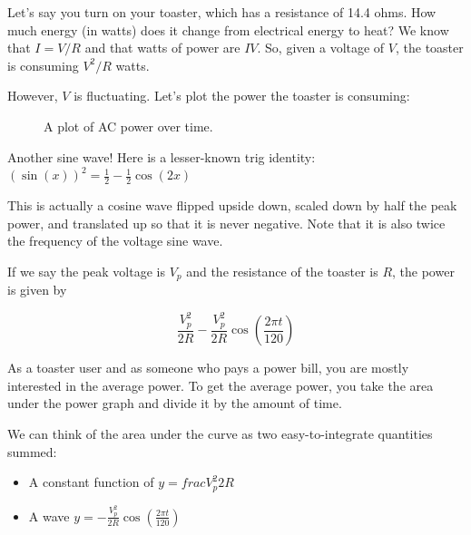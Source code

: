 Let's say you turn on your toaster, which has a resistance of 14.4
ohms. How much energy (in watts) does it change from electrical energy
to heat? We know that $I = V/R$ and that watts of power are
$IV$. So, given a voltage of $V$, the toaster is consuming $V^2/R$
watts.

However, $V$ is fluctuating. Let's plot the power the toaster is consuming:
\begin{figure}[htbp]
    \centering
    \caption{A plot of AC power over time.}
    \label{fig:acpowerGraph}
\end{figure}

Another sine wave! Here is a lesser-known trig identity: $\left( \sin(x) \right)^2 = \frac{1}{2} - \frac{1}{2}\cos(2x)$

This is actually a cosine wave flipped upside down, scaled down by
half the peak power, and translated up so that it is never
negative. Note that it is also twice the frequency of the voltage sine
wave.

If we say the peak voltage is $V_p$ and the resistance of the toaster
is $R$, the power is given by

$$\frac{V_p^2}{2R} - \frac{V_p^2}{2R} \cos \left(\frac{2\pi t}{120} \right)$$

As a toaster user and as someone who pays a power bill, you are mostly
interested in the average power.  To get the average power, you take
the area under the power graph and divide it by the amount of time.

We can think of the area under the curve as two easy-to-integrate quantities summed:
\begin{itemize}
\item A constant function of $y = frac{V_p^2}{2R}$
\item A wave $y = - \frac{V_p^2}{2R} \cos \left(\frac{2\pi t}{120} \right)$
\end{itemize}

